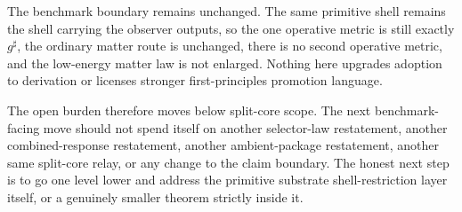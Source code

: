 \documentclass[11pt]{article}
\newcommand{\CompletedMetric}{g^{\sharp}}
\begin{document}
The benchmark boundary remains unchanged. The same primitive shell remains the shell carrying the observer outputs, so the one operative metric is still exactly \(\CompletedMetric\), the ordinary matter route is unchanged, there is no second operative metric, and the low-energy matter law is not enlarged. Nothing here upgrades adoption to derivation or licenses stronger first-principles promotion language.

The open burden therefore moves below split-core scope. The next benchmark-facing move should not spend itself on another selector-law restatement, another combined-response restatement, another ambient-package restatement, another same split-core relay, or any change to the claim boundary. The honest next step is to go one level lower and address the primitive substrate shell-restriction layer itself, or a genuinely smaller theorem strictly inside it.
\end{document}
